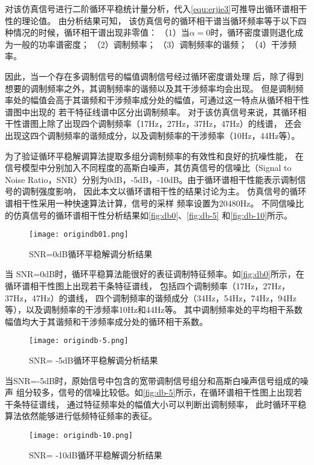 对该仿真信号进行二阶循环平稳统计量分析，代入\autoref{equ:erjie3}可推导出循环谱相干性的理论值。
由分析结果可知，
该仿真信号的循环相干谱当循环频率等于以下四种情况的时候，循环相干谱出现非零值：
（1）当$\alpha=0$时，循环密度谱则退化成为一般的功率谱密度；
（2）调制频率；
（3）调制频率的谐频；
（4）干涉频率。

因此，当一个存在多调制信号的幅值调制信号经过循环密度谱处理
后，除了得到想要的调制频率之外，其调制频率的谐频以及其干涉频率均会出现。
但是调制频率处的幅值会高于其谐频和干涉频率成分处的幅值，可通过这一特点从循环相干性谱图中出现的
若干特征线谱中区分出调制频率。
对于该仿真信号来说，其循环相干性谱图上除了出现四个调制频率（17Hz，27Hz，37Hz，47Hz）的线谱，
还会出现这四个调制频率的谐频成分，以及调制频率的干涉频率（10Hz，44Hz等）。

为了验证循环平稳解调算法提取多组分调制频率的有效性和良好的抗噪性能，
在信号模型中分别加入不同程度的高斯白噪声，其仿真信号的信噪比（Signal to Noise 
Ratio，SNR）分别为0dB，-5dB，-10dB。由于循环谱相干性能表示调制信号的调制强度影响，
因此本文以循环谱相干性的结果讨论为主。
仿真信号的循环谱相干性采用一种快速算法计算，信号的采样
频率设置为20480Hz。
不同信噪比的仿真信号的循环谱相干性分析结果如\autoref{fig:db0}、\autoref{fig:db-5}
和\autoref{fig:db-10}所示。
\begin{figure}[htbp]
    \centering
    \texttt{[image: origindb01.png]}
    \caption{\label{fig:db0}SNR=0dB循环平稳解调分析结果}
\end{figure}

当 SNR=0dB时，循环平稳算法能很好的表征调制特征频率。如\autoref{fig:db0}所示，在循环谱相干性图上出现若干条特征谱线，
包括四个调制频率（17Hz，27Hz，37Hz，47Hz）的谱线，
四个调制频率的谐频成分（34Hz，54Hz，74Hz，94Hz等），以及调制频率的干涉频率10Hz和44Hz等。
其中调制频率处的平均相干系数幅值均大于其谐频和干涉频率成分处的循环相干系数。
\begin{figure}[htbp]
    \centering
    \texttt{[image: origindb-5.png]}
    \caption{\label{fig:db-5}SNR= -5dB循环平稳解调分析结果}
\end{figure}

当SNR=-5dB时，原始信号中包含的宽带调制信号组分和高斯白噪声信号组成的噪声
组分较多，信号的信噪比较低。如\autoref{fig:db-5}所示，在循环谱相干性图上出现若干条特征谱线，
通过特征频率处的幅值大小可以判断出调制频率，
此时循环平稳算法依然能够进行低频特征频率的表征。

\begin{figure}[htbp]
    \centering
    \texttt{[image: origindb-10.png]}
    \caption{\label{fig:db-10}SNR= -10dB循环平稳解调分析结果}
\end{figure}


